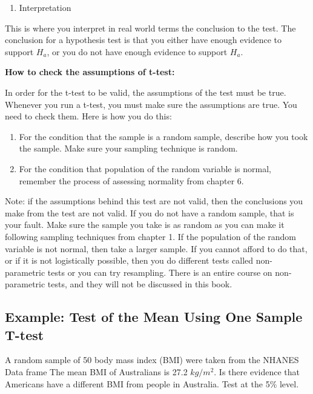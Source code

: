 \documentclass[]{book}
\providecommand{\tightlist}{%
  \setlength{\itemsep}{0pt}\setlength{\parskip}{0pt}}
\begin{document}
\begin{enumerate}
\def\labelenumi{\arabic{enumi}.}
\setcounter{enumi}{5}
\tightlist
\item
  Interpretation
\end{enumerate}

This is where you interpret in real world terms the conclusion to the test. The conclusion for a hypothesis test is that you either have enough evidence to support \(H_a\), or you do not have enough evidence to support \(H_a\).

\textbf{How to check the assumptions of t-test:}

In order for the t-test to be valid, the assumptions of the test must be true. Whenever you run a t-test, you must make sure the assumptions are true. You need to check them. Here is how you do this:

\begin{enumerate}
\def\labelenumi{\arabic{enumi}.}
\item
  For the condition that the sample is a random sample, describe how you took the sample. Make sure your sampling technique is random.
\item
  For the condition that population of the random variable is normal, remember the process of assessing normality from chapter 6.
\end{enumerate}

Note: if the assumptions behind this test are not valid, then the conclusions you make from the test are not valid. If you do not have a random sample, that is your fault. Make sure the sample you take is as random as you can make it following sampling techniques from chapter 1. If the population of the random variable is not normal, then take a larger sample. If you cannot afford to do that, or if it is not logistically possible, then you do different tests called non-parametric tests or you can try resampling. There is an entire course on non-parametric tests, and they will not be discussed in this book.

\hypertarget{example-test-of-the-mean-using-one-sample-t-test}{%
\subsection{Example: Test of the Mean Using One Sample T-test}\label{example-test-of-the-mean-using-one-sample-t-test}}

A random sample of 50 body mass index (BMI) were taken from the NHANES Data frame The mean BMI of Australians is 27.2 \(kg/m^2\). Is there evidence that Americans have a different BMI from people in Australia. Test at the 5\% level.
\end{document}
